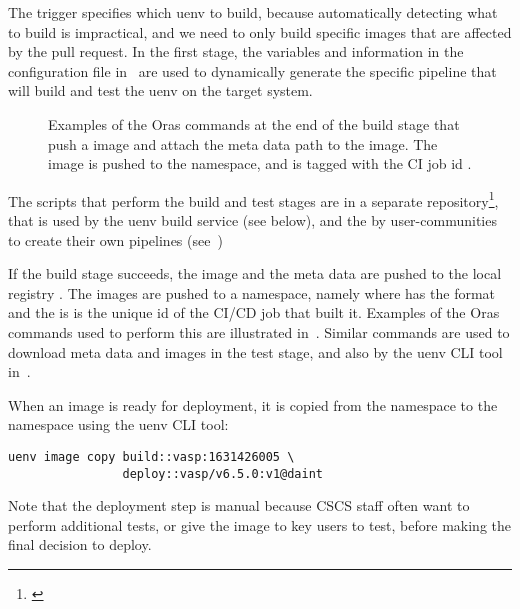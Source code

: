 The trigger specifies which uenv to build, because automatically detecting what to build is impractical, and we need to only build specific images that are affected by the pull request.
In the first stage, the variables and information in the configuration file in~ are used to dynamically generate the specific pipeline that will build and test the uenv on the target system.

\begin{figure}[htp!]
    
    \caption{Examples of the Oras commands at the end of the build stage that push a \squashfs image and attach the meta data path to the image.
    The image is pushed to the  namespace, and is tagged with the CI job id .}
    \label{fig:ci-oras}
\end{figure}

The scripts that perform the build and test stages are in a separate repository\footnote{\href{https://github.com/eth-cscs/uenv-pipeline}{}}, that is used by the uenv build service (see below), and the by user-communities to create their own pipelines (see~)

If the build stage succeeds, the \squashfs image  and the meta data are pushed to the local registry .
The images are pushed to a  namespace, namely  where  has the format  and the  is is the unique id of the CI/CD job that built it.
Examples of the Oras commands used to perform this are illustrated in~.
Similar commands are used to download meta data and \squashfs images in the test stage, and also by the uenv CLI tool in~.

When an image is ready for deployment, it is copied from the  namespace to the  namespace using the uenv CLI tool:
\begin{lstlisting}
uenv image copy build::vasp:1631426005 \
                deploy::vasp/v6.5.0:v1@daint
\end{lstlisting}
Note that the deployment step is manual because CSCS staff often want to perform additional tests, or give the image to key users to test, before making the final decision to deploy.


